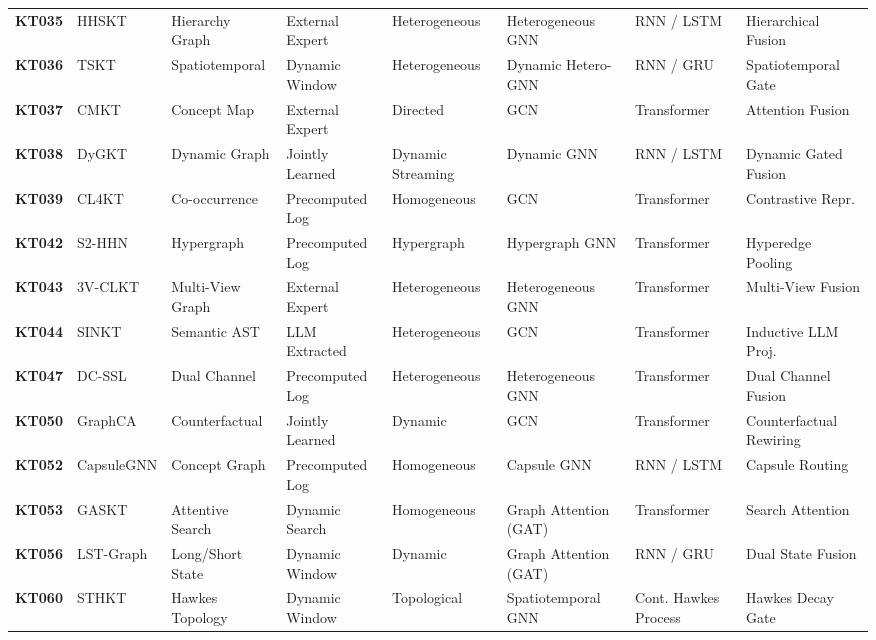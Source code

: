 ﻿\documentclass[10pt,journal,compsoc]{IEEEtran}
\begin{document}
\begin{table}[t]
{\begin{tabular}{@{}l l l l l l l l@{}}
\textbf{KT035} & HHSKT \cite{KT035_HHSKT_2023} & Hierarchy Graph & External Expert & Heterogeneous & Heterogeneous GNN & RNN / LSTM & Hierarchical Fusion \\
\textbf{KT036} & TSKT \cite{KT036_TSKT_2024} & Spatiotemporal & Dynamic Window & Heterogeneous & Dynamic Hetero-GNN & RNN / GRU & Spatiotemporal Gate \\
\textbf{KT037} & CMKT \cite{KT037_CMKT_2022} & Concept Map & External Expert & Directed & GCN & Transformer & Attention Fusion \\
\textbf{KT038} & DyGKT \cite{KT038_DyGKT_2024} & Dynamic Graph & Jointly Learned & Dynamic Streaming & Dynamic GNN & RNN / LSTM & Dynamic Gated Fusion \\
\textbf{KT039} & CL4KT \cite{KT039_CL4KT_2022} & Co-occurrence & Precomputed Log & Homogeneous & GCN & Transformer & Contrastive Repr. \\
\textbf{KT042} & S2-HHN \cite{KT042_S2HHN_2023} & Hypergraph & Precomputed Log & Hypergraph & Hypergraph GNN & Transformer & Hyperedge Pooling \\
\textbf{KT043} & 3V-CLKT \cite{KT043_3VCLKT_2024} & Multi-View Graph & External Expert & Heterogeneous & Heterogeneous GNN & Transformer & Multi-View Fusion \\
\textbf{KT044} & SINKT \cite{KT044_SINKT_2024} & Semantic AST & LLM Extracted & Heterogeneous & GCN & Transformer & Inductive LLM Proj. \\
\textbf{KT047} & DC-SSL \cite{KT047_DCSSL_2023} & Dual Channel & Precomputed Log & Heterogeneous & Heterogeneous GNN & Transformer & Dual Channel Fusion \\
\textbf{KT050} & GraphCA \cite{KT050_GraphCA_2023} & Counterfactual & Jointly Learned & Dynamic & GCN & Transformer & Counterfactual Rewiring \\
\textbf{KT052} & CapsuleGNN \cite{KT052_CapsuleGNN_2022} & Concept Graph & Precomputed Log & Homogeneous & Capsule GNN & RNN / LSTM & Capsule Routing \\
\textbf{KT053} & GASKT \cite{KT053_GASKT_2021} & Attentive Search & Dynamic Search & Homogeneous & Graph Attention (GAT) & Transformer & Search Attention \\
\textbf{KT056} & LST-Graph \cite{KT056_LSTGraph_2025} & Long/Short State & Dynamic Window & Dynamic & Graph Attention (GAT) & RNN / GRU & Dual State Fusion \\
\textbf{KT060} & STHKT \cite{KT060_STHKT_2025} & Hawkes Topology & Dynamic Window & Topological & Spatiotemporal GNN & Cont. Hawkes Process & Hawkes Decay Gate \\

\end{tabular}}
\end{table}
\end{document}
